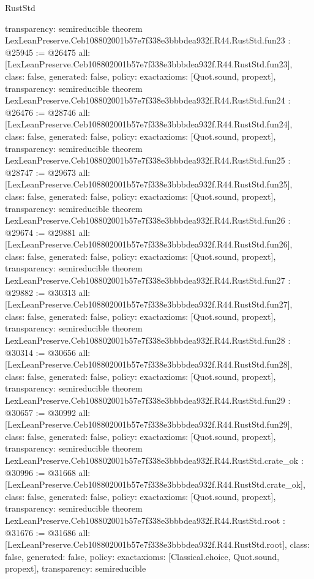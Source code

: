 \begin{lexlean}{RustStd}
\begin{coremodule}
{  transparency: semireducible
}
theorem LexLeanPreserve.Ceb108802001b57e7f338e3bbbdea932f.R44.RustStd.fun23 : @25945 := @26475 {
  all: [LexLeanPreserve.Ceb108802001b57e7f338e3bbbdea932f.R44.RustStd.fun23],
  class: false,
  generated: false,
  policy: exact{axioms: [Quot.sound, propext]},
  transparency: semireducible
}
theorem LexLeanPreserve.Ceb108802001b57e7f338e3bbbdea932f.R44.RustStd.fun24 : @26476 := @28746 {
  all: [LexLeanPreserve.Ceb108802001b57e7f338e3bbbdea932f.R44.RustStd.fun24],
  class: false,
  generated: false,
  policy: exact{axioms: [Quot.sound, propext]},
  transparency: semireducible
}
theorem LexLeanPreserve.Ceb108802001b57e7f338e3bbbdea932f.R44.RustStd.fun25 : @28747 := @29673 {
  all: [LexLeanPreserve.Ceb108802001b57e7f338e3bbbdea932f.R44.RustStd.fun25],
  class: false,
  generated: false,
  policy: exact{axioms: [Quot.sound, propext]},
  transparency: semireducible
}
theorem LexLeanPreserve.Ceb108802001b57e7f338e3bbbdea932f.R44.RustStd.fun26 : @29674 := @29881 {
  all: [LexLeanPreserve.Ceb108802001b57e7f338e3bbbdea932f.R44.RustStd.fun26],
  class: false,
  generated: false,
  policy: exact{axioms: [Quot.sound, propext]},
  transparency: semireducible
}
theorem LexLeanPreserve.Ceb108802001b57e7f338e3bbbdea932f.R44.RustStd.fun27 : @29882 := @30313 {
  all: [LexLeanPreserve.Ceb108802001b57e7f338e3bbbdea932f.R44.RustStd.fun27],
  class: false,
  generated: false,
  policy: exact{axioms: [Quot.sound, propext]},
  transparency: semireducible
}
theorem LexLeanPreserve.Ceb108802001b57e7f338e3bbbdea932f.R44.RustStd.fun28 : @30314 := @30656 {
  all: [LexLeanPreserve.Ceb108802001b57e7f338e3bbbdea932f.R44.RustStd.fun28],
  class: false,
  generated: false,
  policy: exact{axioms: [Quot.sound, propext]},
  transparency: semireducible
}
theorem LexLeanPreserve.Ceb108802001b57e7f338e3bbbdea932f.R44.RustStd.fun29 : @30657 := @30992 {
  all: [LexLeanPreserve.Ceb108802001b57e7f338e3bbbdea932f.R44.RustStd.fun29],
  class: false,
  generated: false,
  policy: exact{axioms: [Quot.sound, propext]},
  transparency: semireducible
}
theorem LexLeanPreserve.Ceb108802001b57e7f338e3bbbdea932f.R44.RustStd.crate_ok : @30996 := @31668 {
  all: [LexLeanPreserve.Ceb108802001b57e7f338e3bbbdea932f.R44.RustStd.crate_ok],
  class: false,
  generated: false,
  policy: exact{axioms: [Quot.sound, propext]},
  transparency: semireducible
}
theorem LexLeanPreserve.Ceb108802001b57e7f338e3bbbdea932f.R44.RustStd.root : @31676 := @31686 {
  all: [LexLeanPreserve.Ceb108802001b57e7f338e3bbbdea932f.R44.RustStd.root],
  class: false,
  generated: false,
  policy: exact{axioms: [Classical.choice, Quot.sound, propext]},
  transparency: semireducible
}


\end{coremodule}
\end{lexlean}
